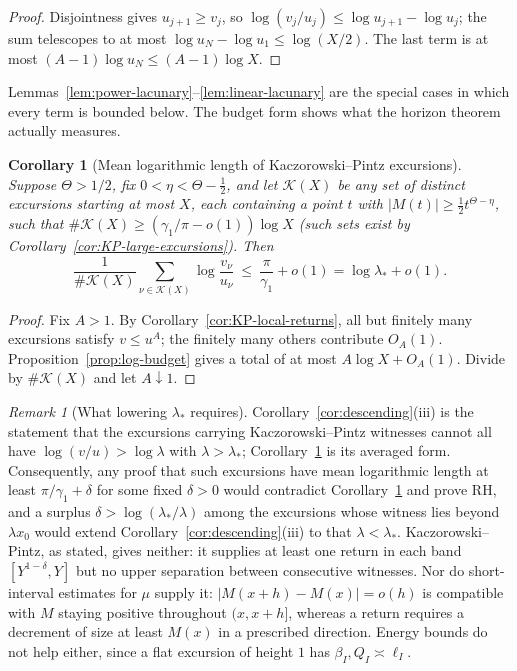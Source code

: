 \documentclass[11pt]{amsart}
\numberwithin{equation}{section}
\theoremstyle{plain}
\newtheorem{corollary}[theorem]{Corollary}
\theoremstyle{definition}
\theoremstyle{remark}
\newtheorem{remark}[theorem]{Remark}
\begin{document}
\begin{proof}
Disjointness gives $u_{j+1}\ge v_j$, so
$\log(v_j/u_j)\le\log u_{j+1}-\log u_j$; the sum telescopes to at most
$\log u_N-\log u_1\le\log(X/2)$. The last term is at most
$(A-1)\log u_N\le(A-1)\log X$.
\end{proof}

Lemmas~\ref{lem:power-lacunary}--\ref{lem:linear-lacunary} are the special
cases in which every term is bounded below. The budget form shows what the
horizon theorem actually measures.

\begin{corollary}[Mean logarithmic length of Kaczorowski--Pintz excursions]
\label{cor:KP-mean-log-length}
Suppose $\Theta>1/2$, fix $0<\eta<\Theta-\frac12$, and let $\mathcal K(X)$
be any set of distinct excursions starting at most $X$, each containing a
point $t$ with $|M(t)|\ge\frac12t^{\Theta-\eta}$, such that
$\#\mathcal K(X)\ge(\gamma_1/\pi-o(1))\log X$ (such sets exist by
Corollary~\ref{cor:KP-large-excursions}). Then
\[
\frac1{\#\mathcal K(X)}\sum_{\nu\in\mathcal K(X)}\log\frac{v_\nu}{u_\nu}
\ \le\ \frac{\pi}{\gamma_1}+o(1)=\log\lambda_*+o(1).
\]
\end{corollary}

\begin{proof}
Fix $A>1$. By Corollary~\ref{cor:KP-local-returns}, all but finitely many
excursions satisfy $v\le u^A$; the finitely many others contribute $O_A(1)$.
Proposition~\ref{prop:log-budget} gives a total of at most
$A\log X+O_A(1)$. Divide by $\#\mathcal K(X)$ and let $A\downarrow1$.
\end{proof}

\begin{remark}[What lowering $\lambda_*$ requires]
\label{rem:surplus}
Corollary~\ref{cor:descending}(iii) is the statement that the
excursions carrying Kaczorowski--Pintz witnesses cannot all have
$\log(v/u)>\log\lambda$ with $\lambda>\lambda_*$;
Corollary~\ref{cor:KP-mean-log-length} is its averaged form. Consequently,
any proof that such excursions have mean logarithmic length at least
$\pi/\gamma_1+\delta$ for some fixed $\delta>0$ would contradict
Corollary~\ref{cor:KP-mean-log-length} and prove RH, and a surplus
$\delta>\log(\lambda_*/\lambda)$ among the excursions whose witness lies
beyond $\lambda x_0$ would extend Corollary~\ref{cor:descending}(iii) to
that $\lambda<\lambda_*$. Kaczorowski--Pintz, as stated, gives neither: it
supplies at least one return in each band $[Y^{1-\delta},Y]$ but no upper
separation between consecutive witnesses. Nor do short-interval estimates
for $\mu$ supply it: $|M(x+h)-M(x)|=o(h)$ is compatible with $M$ staying
positive throughout $(x,x+h]$, whereas a return requires a decrement of
size at least $M(x)$ in a prescribed direction. Energy bounds do not help
either, since a flat excursion of height $1$ has $\beta_I,Q_I\asymp\ell_I$.
\end{remark}
\end{document}
